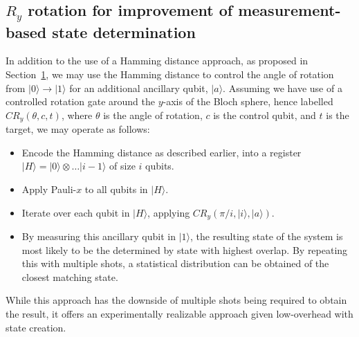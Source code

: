\begin{appendices}
\section{$R_y$ rotation for improvement of measurement-based state determination}
In addition to the use of a Hamming distance approach, as proposed in Section~\ref{}, we may use the Hamming distance to control the angle of rotation from $|0\rangle\rightarrow\vert 1\rangle$ for an additional ancillary qubit, $\vert a \rangle$. Assuming we have use of a controlled rotation gate around the $y$-axis of the Bloch sphere, hence labelled $CR_y(\theta,c,t)$, where $\theta$ is the angle of rotation, $c$ is the control qubit, and $t$ is the target, we may operate as follows:
\begin{itemize}
    \item Encode the Hamming distance as described earlier, into a register $\vert H\rangle = \vert 0\rangle\otimes\dots\vert i-1\rangle$ of size $i$ qubits.
    \item Apply Pauli-$x$ to all qubits in $\vert H \rangle$.
    \item Iterate over each qubit in $\vert H\rangle$, applying $CR_y(\pi/i, \vert i \rangle, \vert a\rangle)$.
    \item By measuring this ancillary qubit in $\vert 1\rangle$, the resulting state of the system is most likely to be the determined by state with highest overlap. By repeating this with multiple shots, a statistical distribution can be obtained of the closest matching state.
\end{itemize}
While this approach has the downside of multiple shots being required to obtain the result, it offers an experimentally realizable approach given low-overhead with state creation.

\end{appendices}


